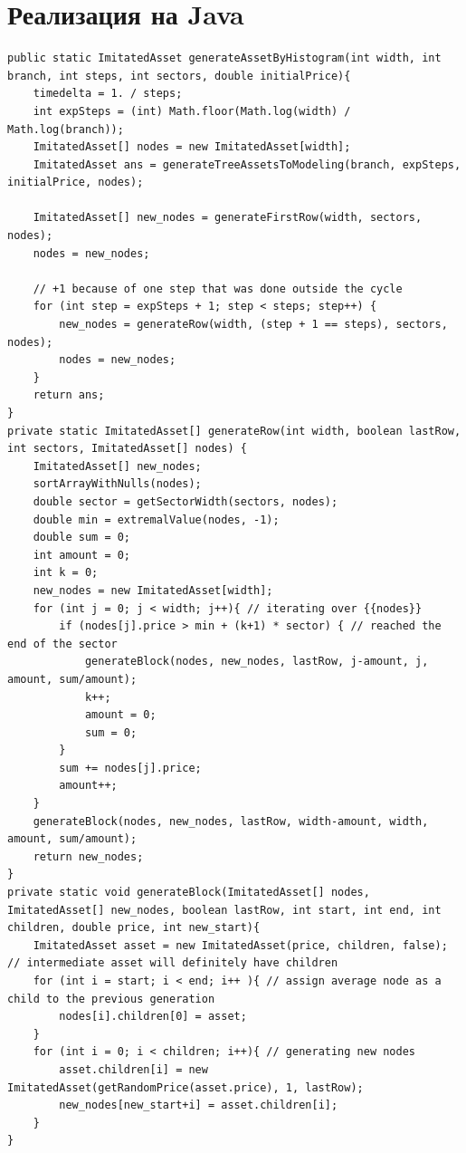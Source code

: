 \documentclass[specialist,
               substylefile = spbu.rtx,
               subf,href,colorlinks=true, 12pt]{disser}
\begin{document}
\chapter{Реализация на Java}
\renewcommand{\lstlistingname}{Листинг}%
\renewcommand{\lstlistlistingname}{Листинги}
\begin{lstlisting}[caption={Генерирование дерева состояний актива, на который выписан опцион},label={lst:treeGeneration}]
public static ImitatedAsset generateAssetByHistogram(int width, int branch, int steps, int sectors, double initialPrice){
    timedelta = 1. / steps;
    int expSteps = (int) Math.floor(Math.log(width) / Math.log(branch));
    ImitatedAsset[] nodes = new ImitatedAsset[width];
    ImitatedAsset ans = generateTreeAssetsToModeling(branch, expSteps, initialPrice, nodes);

    ImitatedAsset[] new_nodes = generateFirstRow(width, sectors, nodes);
    nodes = new_nodes;

    // +1 because of one step that was done outside the cycle
    for (int step = expSteps + 1; step < steps; step++) {
        new_nodes = generateRow(width, (step + 1 == steps), sectors, nodes);
        nodes = new_nodes;
    }
    return ans;
}
private static ImitatedAsset[] generateRow(int width, boolean lastRow, int sectors, ImitatedAsset[] nodes) {
    ImitatedAsset[] new_nodes;
    sortArrayWithNulls(nodes);
    double sector = getSectorWidth(sectors, nodes);
    double min = extremalValue(nodes, -1);
    double sum = 0;
    int amount = 0;
    int k = 0;
    new_nodes = new ImitatedAsset[width];
    for (int j = 0; j < width; j++){ // iterating over {{nodes}}
        if (nodes[j].price > min + (k+1) * sector) { // reached the end of the sector
            generateBlock(nodes, new_nodes, lastRow, j-amount, j, amount, sum/amount);
            k++;
            amount = 0;
            sum = 0;
        }
        sum += nodes[j].price;
        amount++;
    }
    generateBlock(nodes, new_nodes, lastRow, width-amount, width, amount, sum/amount);
    return new_nodes;
}
private static void generateBlock(ImitatedAsset[] nodes, ImitatedAsset[] new_nodes, boolean lastRow, int start, int end, int children, double price, int new_start){
    ImitatedAsset asset = new ImitatedAsset(price, children, false); // intermediate asset will definitely have children
    for (int i = start; i < end; i++ ){ // assign average node as a child to the previous generation
        nodes[i].children[0] = asset;
    }
    for (int i = 0; i < children; i++){ // generating new nodes
        asset.children[i] = new ImitatedAsset(getRandomPrice(asset.price), 1, lastRow);
        new_nodes[new_start+i] = asset.children[i];
    }
}
	\end{lstlisting}
\end{document}
